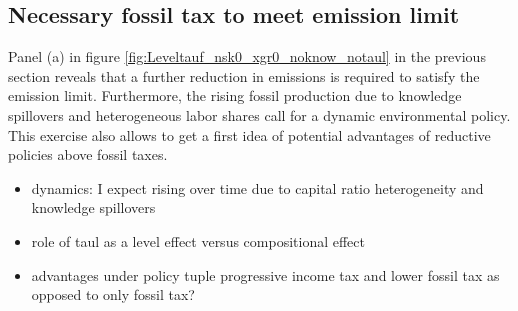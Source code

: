  \clearpage
 
 \subsection{Necessary fossil tax to meet emission limit}
 Panel (a) in figure \ref{fig:Leveltauf_nsk0_xgr0_noknow_notaul} in the previous section reveals that a further reduction in emissions is required to satisfy the emission limit. Furthermore, the rising fossil production due to knowledge spillovers and heterogeneous labor shares call for a dynamic environmental policy. 
 This exercise also allows to get a first idea of potential advantages of reductive policies above fossil taxes. 
 
 \begin{itemize}
 	\item dynamics: I expect rising over time due to capital ratio heterogeneity and knowledge spillovers
 	\item role of taul as a level effect versus compositional effect
 	\item advantages under policy tuple progressive income tax and lower fossil tax as opposed to only fossil tax?
 \end{itemize}